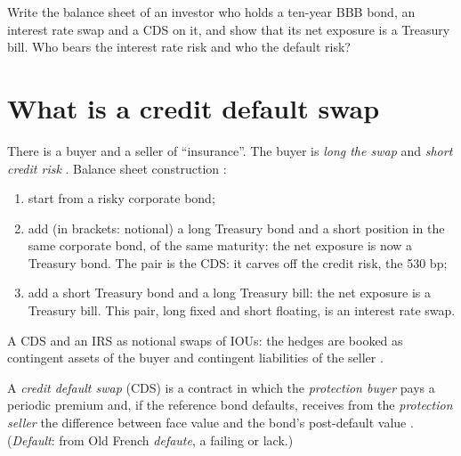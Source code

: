 \begin{paracol}{2}
\begin{exercise}
Write the balance sheet of an investor who holds a ten-year BBB bond, an interest rate swap and a CDS on it, and show that its net exposure is a Treasury bill. Who
bears the interest rate risk and who the default risk?
\end{exercise}

\section{What is a credit default swap}\label{sec:cds-what}

There is a buyer and a seller of ``insurance''. The buyer is \emph{long the swap} and \emph{short credit risk} . Balance sheet
construction :
\begin{enumerate}
  \item start from a risky corporate bond;
  \item add (in brackets: notional) a long Treasury bond and a short position in the same corporate bond, of the same maturity: the net exposure is now a
        Treasury bond. The pair is the CDS: it carves off the credit risk, the 530 bp;
  \item add a short Treasury bond and a long Treasury bill: the net exposure is a Treasury bill. This pair, long fixed and short floating, is an interest rate swap.
\end{enumerate}

\begin{nfigure}
\begin{taccts}
\qquad
{}
\end{taccts}
\caption{A CDS and an IRS as notional swaps of IOUs: the hedges are booked as contingent assets of the buyer and contingent liabilities of the seller
.}\label{fig:cds-bs}
\end{nfigure}

\begin{definition}
A \emph{credit default swap} (CDS) is a contract in which the \emph{protection buyer} pays a periodic premium and, if the reference bond defaults, receives
from the \emph{protection seller} the difference between face value and the bond's post-default value .
(\emph{Default}: from Old French \emph{defaute}, a failing or lack.)
\end{definition}


\end{paracol}
